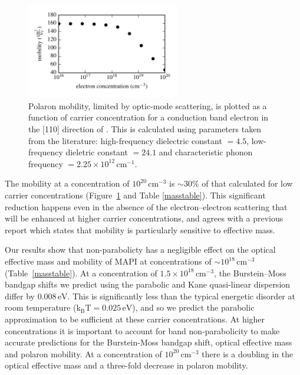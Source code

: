 \begin{figure}[tb] \centering
\includegraphics[width=0.6\textwidth]{./figures/ch4/mobility.pdf}
\caption[Polaron mobility as a function of carrier concentration]{\label{mobility_plot} Polaron mobility, limited by optic-mode scattering, is plotted as a function of carrier concentration for a conduction band electron in the [110] direction of . This is calculated using parameters taken from the literature:\autocite{Frost2017b} high-frequency dielectric constant $=4.5$, low-frequency dieletric constant $=24.1$ and characteristic phonon frequency $=2.25\times10^{12}\,\mathrm{cm}^{-1}$.}
\end{figure}

The mobility at a concentration of $10^{20}\,\mathrm{cm}^{-3}$ is $\sim30\%$ of that calculated for low carrier concentrations (Figure\ \ref{mobility_plot} and Table \ref{masstable}).
This significant reduction happens even in the absence of the electron--electron scattering that will be enhanced at higher carrier concentrations,
and agrees with a previous report which states that mobility is particularly sensitive to effective mass.\autocite{Ponce2018} 

Our results show that non-parabolicty has a negligible effect on the optical effective mass and mobility of MAPI at concentrations of $\sim10^{18}\,\mathrm{cm}^{-3}$ (Table\ \ref{masstable}).
At a concentration of $1.5\!\times\!10^{18}\,\mathrm{cm}^{-3}$, the Burstein--Moss bandgap shifts we predict using the parabolic and Kane quasi-linear dispersion differ by $0.008\,\text{eV}$.
This is significantly less than the typical energetic disorder at room temperature ($\mathrm{k_\mathrm{B}T}=0.025\,\mathrm{eV}$), and so we predict the parabolic approximation to be sufficient at these carrier concentrations.
At higher concentrations it is important to account for band non-parabolicity to make accurate predictions for the Burstein-Moss bandgap shift, optical effective mass and polaron mobility. 
At a concentration of $10^{20}\,\mathrm{cm}^{-3}$ there is a doubling in the optical effective mass and a three-fold decrease in polaron mobility. 



